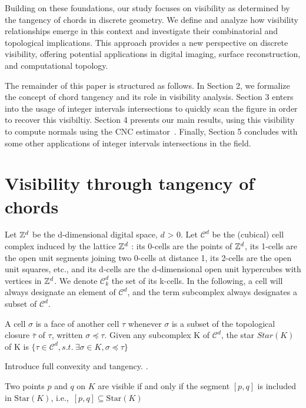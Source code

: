 \documentclass[runningheads]{llncs}
\begin{document}
    Building on these foundations, our study focuses on visibility as determined by the tangency of chords in discrete geometry.
    We define and analyze how visibility relationships emerge in this context and investigate their combinatorial and topological implications.
    This approach provides a new perspective on discrete visibility, offering potential applications in digital imaging, surface reconstruction, and computational topology.

    The remainder of this paper is structured as follows.
    In Section 2, we formalize the concept of chord tangency and its role in visibility analysis.
    Section 3 enters into the usage of integer intervals intersections to quickly scan the figure in order to recover this visibiltiy.
    Section 4 presents our main results, using this visibility to compute normals using the CNC estimator~\cite*{lachaud:2022-dcg}.
    Finally, Section 5 concludes with some other applications of integer intervals intersections in the field.




    \section{Visibility through tangency of chords}


    Let $\mathbb{Z}^d$ be the d-dimensional digital space, $d$ > 0.
    Let $\mathcal{C}^d$ be the (cubical) cell complex induced by the lattice $\mathbb{Z}^d$ : its 0-cells are the points of $\mathbb{Z}^d$, its 1-cells are the open unit segments joining two 0-cells at distance 1, its 2-cells are the open unit squares, etc., and its d-cells are the d-dimensional open unit hypercubes with vertices in $\mathbb{Z}^d$.
    We denote $\mathcal{C}^d_k$ the set of its k-cells.
    In the following, a cell will always designate an element of $\mathcal{C}^d$, and the term subcomplex always designates a subset of $\mathcal{C}^d$.

    A cell $\sigma$ is a face of another cell $\tau$ whenever $\sigma$ is a subset of the topological closure $\bar{\tau}$ of $\tau$, written $\sigma \preccurlyeq \tau$.
    Given any subcomplex K of $\mathcal{C}^d$, the star $Star(K)$ of K is $\{\tau \in \mathcal{C}^d, s.t.\ \exists\sigma \in K,\sigma \preccurlyeq \tau\}$


    Introduce full convexity and tangency. \cite{lachaud:2021-dgmm,lachaud:2022-jmiv}.

    \begin{definition}
        Two points \( p \) and \( q \) on \( K \) are visible if and only if the segment \([p, q]\) is included in \(\text{Star}(K)\), i.e.,\ \( [p, q] \subseteq \text{Star}(K)\)
    \end{definition}
\end{document}
